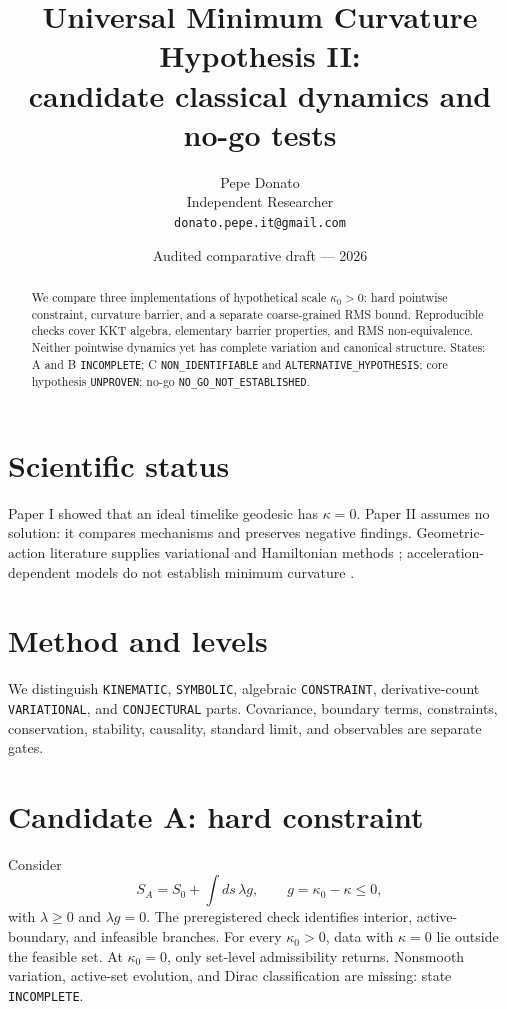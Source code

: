 \documentclass[11pt,a4paper]{article}
\title{Universal Minimum Curvature Hypothesis II:\\candidate classical dynamics and no-go tests}
\author{Pepe Donato\\Independent Researcher\\\texttt{donato.pepe.it@gmail.com}}
\date{Audited comparative draft --- 2026}
\begin{document}
\maketitle

\begin{abstract}
We compare three implementations of hypothetical scale $\kappa_0>0$: hard pointwise constraint, curvature barrier, and a separate coarse-grained RMS bound. Reproducible checks cover KKT algebra, elementary barrier properties, and RMS non-equivalence. Neither pointwise dynamics yet has complete variation and canonical structure. States: A and B \texttt{INCOMPLETE}; C \texttt{NON\_IDENTIFIABLE} and \texttt{ALTERNATIVE\_HYPOTHESIS}; core hypothesis \texttt{UNPROVEN}; no-go \texttt{NO\_GO\_NOT\_ESTABLISHED}.
\end{abstract}

\section{Scientific status}\label{sec:p2-status}
Paper I showed that an ideal timelike geodesic has $\kappa=0$. Paper II assumes no solution: it compares mechanisms and preserves negative findings. Geometric-action literature supplies variational and Hamiltonian methods \cite{ArreagaCapovillaGuven2001,CapovillaGuvenRojas2002}; acceleration-dependent models do not establish minimum curvature \cite{NesterenkoEtAl1995}.

\section{Method and levels}\label{sec:p2-method}
We distinguish \texttt{KINEMATIC}, \texttt{SYMBOLIC}, algebraic \texttt{CONSTRAINT}, derivative-count \texttt{VARIATIONAL}, and \texttt{CONJECTURAL} parts. Covariance, boundary terms, constraints, conservation, stability, causality, standard limit, and observables are separate gates.

\section{Candidate A: hard constraint}\label{sec:p2-a}
Consider
\begin{equation}\label{eq:p2-hard}
S_A=S_0+\int ds\,\lambda g,\qquad g=\kappa_0-\kappa\le0,
\end{equation}
with $\lambda\ge0$ and $\lambda g=0$. The preregistered check identifies interior, active-boundary, and infeasible branches. For every $\kappa_0>0$, data with $\kappa=0$ lie outside the feasible set. At $\kappa_0=0$, only set-level admissibility returns. Nonsmooth variation, active-set evolution, and Dirac classification are missing: state \texttt{INCOMPLETE}.
\end{document}
